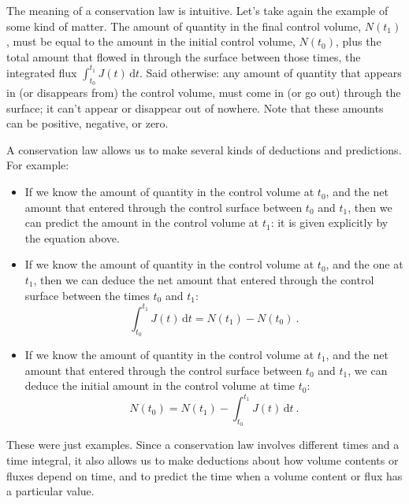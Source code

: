 \documentclass[a4paper,12pt,%
onecolumn,oneside,%
british%
]{memoir}
\newcommand*{\di}{\mathrm{d}}%
\renewcommand*{\|}[1][]{\nonscript\:#1\vert\nonscript\:\mathopen{}}
\newcommand*{\yti}{t_{0}}
\newcommand*{\ytf}{t_{1}}
\newcommand*{\yN}{N}
\newcommand*{\yJ}{J}
\begin{document}
The meaning of a conservation law is intuitive. Let's take again the example of some kind of matter. The amount of quantity in the final control volume, $\yN(\ytf)$, must be equal to the amount in the initial control volume, $\yN(\yti)$, plus the total amount that flowed in through the surface between those times, the integrated flux $\int_{\yti}^{\ytf}\!\!\yJ(t)\, \di t$. Said otherwise: any amount of quantity that appears in (or disappears from) the control volume, must come in (or go out) through the surface; it can't appear or disappear out of nowhere. Note that these amounts can be positive, negative, or zero.

A conservation law allows us to make several kinds of deductions and predictions. For example:
\begin{itemize}
\item If we know the amount of quantity in the control volume at $\yti$, and the net amount that entered through the control surface between $\yti$ and $\ytf$, then we can predict the amount in the control volume at $\ytf$: it is given explicitly by the equation above.

\item If we know the amount of quantity in the control volume at $\yti$, and the one at $\ytf$, then we can deduce the net amount that entered through the control surface between the times $\yti$ and $\ytf$:
  \begin{equation*}
    \int_{\yti}^{\ytf}\!\!\yJ(t)\, \di t = \yN(\ytf) - \yN(\yti) \ .
  \end{equation*}

\item If we know the amount of quantity in the control volume at $\ytf$, and the net amount that entered through the control surface between $\yti$ and $\ytf$, we can deduce the initial amount in the control volume at time $\yti$:
  \begin{equation*}
    \yN(\yti) = \yN(\ytf) - \int_{\yti}^{\ytf}\!\!\yJ(t)\, \di t \ .
  \end{equation*}
\end{itemize}

These were just examples. Since a conservation law involves different times and a time integral, it also allows us to make deductions about how volume contents or fluxes depend on time, and to predict the time when a volume content or flux has a particular value.
\end{document}
